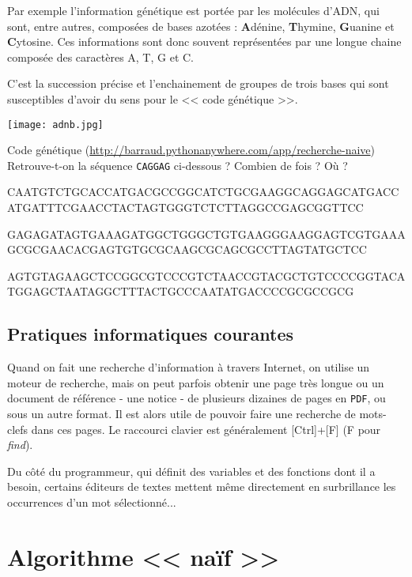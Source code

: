 \documentclass[a4paper,10pt]{report}  %
\theoremstyle{exo}
\begin{document}
\begin{multicols}{2}
Par exemple l'information génétique est portée par les molécules d'ADN, qui sont, entre autres, composées de bases azotées : {\bfseries A}dénine, {\bfseries T}hymine, {\bfseries G}uanine et {\bfseries C}ytosine. Ces informations sont donc souvent représentées par une longue chaine composée des caractères A, T, G et C. 

C'est la succession précise et l'enchainement de groupes de trois bases qui sont susceptibles d'avoir du sens pour le << code génétique >>.

\begin{center}\texttt{[image: adnb.jpg]}\end{center}
\end{multicols}

\begin{exemple*}{Code génétique (\href{http://barraud.pythonanywhere.com/app/recherche-naive}{http://barraud.pythonanywhere.com/app/recherche-naive})}
Retrouve-t-on la séquence \texttt{CAGGAG} ci-dessous ? Combien de fois ? Où ? 

\ttfamily
CAATGTCTGCACCATGACGCCGGCATCTGCGAAGGCAGGAGCATGACCATGATTTCGAACCTACTAGTGGGTCTCTTAGGCCGAGCGGTTCC

GAGAGATAGTGAAAGATGGCTGGGCTGTGAAGGGAAGGAGTCGTGAAAGCGCGAACACGAGTGTGCGCAAGCGCAGCGCCTTAGTATGCTCC

AGTGTAGAAGCTCCGGCGTCCCGTCTAACCGTACGCTGTCCCCGGTACATGGAGCTAATAGGCTTTACTGCCCAATATGACCCCGCGCCGCG
\end{exemple*}

\subsection{Pratiques informatiques courantes}

Quand on fait une recherche d'information à travers Internet, on utilise un moteur de recherche, mais on peut parfois obtenir une page très longue ou un document de référence - une notice - de plusieurs dizaines de pages en \texttt{PDF}, ou sous un autre format. Il est alors utile de pouvoir faire une recherche de mots-clefs dans ces pages. Le raccourci clavier est généralement [Ctrl]+[F] (F pour \textit{find}).

Du côté du programmeur, qui définit des variables et des fonctions dont il a besoin, certains éditeurs de textes mettent même directement en surbrillance les occurrences d'un mot sélectionné...

\section{Algorithme << naïf >>}
\end{document}
